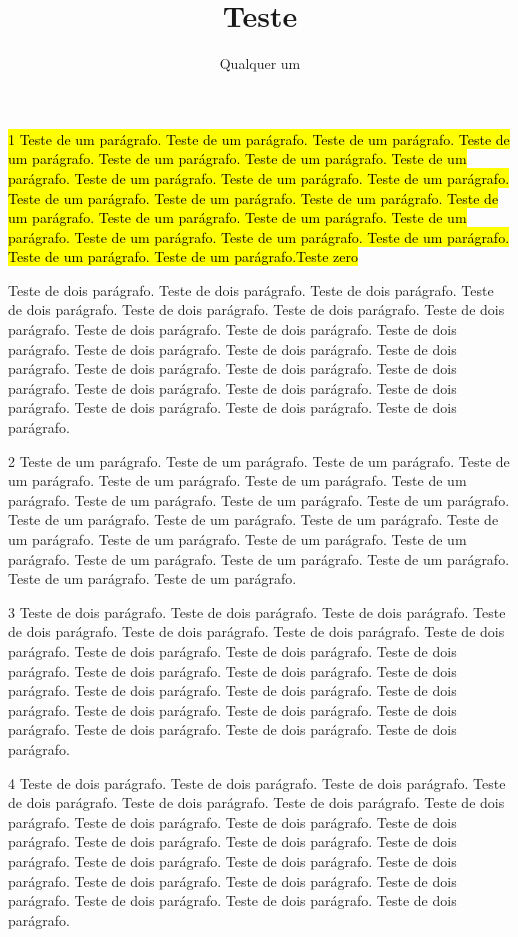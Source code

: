 \documentclass[12pt]{article}
\title{Teste}
\author{Qualquer um}
\begin{document}
\maketitle
{}

\hl{1 Teste de um parágrafo. Teste de um parágrafo. Teste de um parágrafo. Teste de um parágrafo. Teste de um parágrafo. Teste de um parágrafo. Teste de um parágrafo. Teste de um parágrafo. Teste de um parágrafo. Teste de um parágrafo. Teste de um parágrafo. Teste de um parágrafo. Teste de um parágrafo. Teste de um parágrafo. Teste de um parágrafo. Teste de um parágrafo. Teste de um parágrafo. Teste de um parágrafo. Teste de um parágrafo. Teste de um parágrafo. Teste de um parágrafo. Teste de um parágrafo.Teste zero}

Teste de dois parágrafo. Teste de dois parágrafo. Teste de dois parágrafo. Teste de dois parágrafo. Teste de dois parágrafo. Teste de dois parágrafo. Teste de dois parágrafo. Teste de dois parágrafo. Teste de dois parágrafo. Teste de dois parágrafo. Teste de dois parágrafo. Teste de dois parágrafo. Teste de dois parágrafo. Teste de dois parágrafo. Teste de dois parágrafo. Teste de dois parágrafo. Teste de dois parágrafo. Teste de dois parágrafo. Teste de dois parágrafo. Teste de dois parágrafo. Teste de dois parágrafo. Teste de dois parágrafo.

2 Teste de um parágrafo. Teste de um parágrafo. Teste de um parágrafo. Teste de um parágrafo. Teste de um parágrafo. Teste de um parágrafo. Teste de um parágrafo. Teste de um parágrafo. Teste de um parágrafo. Teste de um parágrafo. Teste de um parágrafo. Teste de um parágrafo. Teste de um parágrafo. Teste de um parágrafo. Teste de um parágrafo. Teste de um parágrafo. Teste de um parágrafo. Teste de um parágrafo. Teste de um parágrafo. Teste de um parágrafo. Teste de um parágrafo. Teste de um parágrafo.

3 Teste de dois parágrafo. Teste de dois parágrafo. Teste de dois parágrafo. Teste de dois parágrafo. Teste de dois parágrafo. Teste de dois parágrafo. Teste de dois parágrafo. Teste de dois parágrafo. Teste de dois parágrafo. Teste de dois parágrafo. Teste de dois parágrafo. Teste de dois parágrafo. Teste de dois parágrafo. Teste de dois parágrafo. Teste de dois parágrafo. Teste de dois parágrafo. Teste de dois parágrafo. Teste de dois parágrafo. Teste de dois parágrafo. Teste de dois parágrafo. Teste de dois parágrafo. Teste de dois parágrafo.

4 Teste de dois parágrafo. Teste de dois parágrafo. Teste de dois parágrafo. Teste de dois parágrafo. Teste de dois parágrafo. Teste de dois parágrafo. Teste de dois parágrafo. Teste de dois parágrafo. Teste de dois parágrafo. Teste de dois parágrafo. Teste de dois parágrafo. Teste de dois parágrafo. Teste de dois parágrafo. Teste de dois parágrafo. Teste de dois parágrafo. Teste de dois parágrafo. Teste de dois parágrafo. Teste de dois parágrafo. Teste de dois parágrafo. Teste de dois parágrafo. Teste de dois parágrafo. Teste de dois parágrafo.
\end{document}
